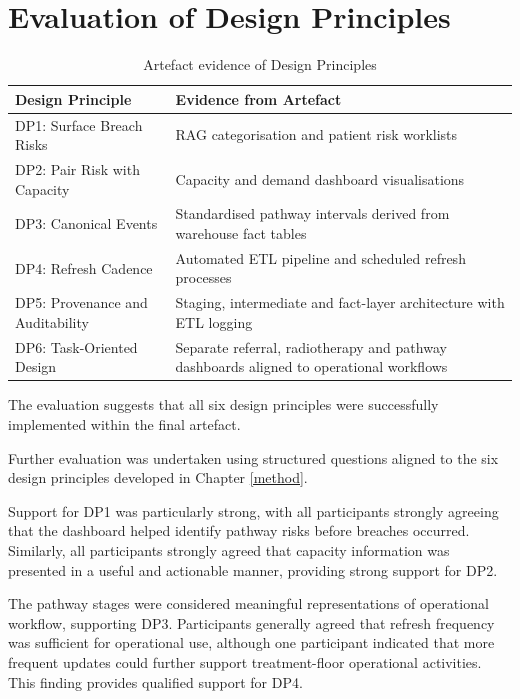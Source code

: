 \section{Evaluation of Design Principles}

\begin{table}[h]
    \centering
    \begin{tabular}{|p{7.5cm}|p{7.5cm}|}
        \hline
        \textbf{Design Principle} & \textbf{Evidence from Artefact} \\
        \hline\hline
        DP1: Surface Breach Risks & RAG categorisation and patient risk worklists \\
        DP2: Pair Risk with Capacity & Capacity and demand dashboard visualisations \\
        DP3: Canonical Events & Standardised pathway intervals derived from warehouse fact tables \\
        DP4: Refresh Cadence & Automated ETL pipeline and scheduled refresh processes \\
        DP5: Provenance and Auditability & Staging, intermediate and fact-layer architecture with ETL logging \\
        DP6: Task-Oriented Design & Separate referral, radiotherapy and pathway dashboards aligned to operational workflows \\
        \hline
    \end{tabular}
    \caption{Artefact evidence of Design Principles}
    \label{tab:DP-Art}
\end{table}

The evaluation suggests that all six design principles were successfully implemented within the final artefact.

Further evaluation was undertaken using structured questions aligned to the six design principles developed in Chapter \ref{method}. 

Support for DP1 was particularly strong, with all participants strongly agreeing that the dashboard helped identify pathway risks before breaches occurred. Similarly, all participants strongly agreed that capacity information was presented in a useful and actionable manner, providing strong support for DP2. 

The pathway stages were considered meaningful representations of operational workflow, supporting DP3. Participants generally agreed that refresh frequency was sufficient for operational use, although one participant indicated that more frequent updates could further support treatment-floor operational activities. This finding provides qualified support for DP4. 

